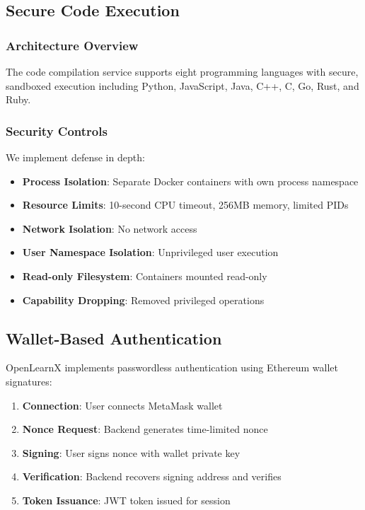 \documentclass[conference]{IEEEtran}
\begin{document}
\subsection{Secure Code Execution}

\subsubsection{Architecture Overview}

The code compilation service supports eight programming languages with secure, sandboxed execution including Python, JavaScript, Java, C++, C, Go, Rust, and Ruby.

\subsubsection{Security Controls}

We implement defense in depth:

\begin{itemize}
    \item \textbf{Process Isolation}: Separate Docker containers with own process namespace
    \item \textbf{Resource Limits}: 10-second CPU timeout, 256MB memory, limited PIDs
    \item \textbf{Network Isolation}: No network access
    \item \textbf{User Namespace Isolation}: Unprivileged user execution
    \item \textbf{Read-only Filesystem}: Containers mounted read-only
    \item \textbf{Capability Dropping}: Removed privileged operations
\end{itemize}

\subsection{Wallet-Based Authentication}

OpenLearnX implements passwordless authentication using Ethereum wallet signatures:

\begin{enumerate}
    \item \textbf{Connection}: User connects MetaMask wallet
    \item \textbf{Nonce Request}: Backend generates time-limited nonce
    \item \textbf{Signing}: User signs nonce with wallet private key
    \item \textbf{Verification}: Backend recovers signing address and verifies
    \item \textbf{Token Issuance}: JWT token issued for session
\end{enumerate}
\end{document}
